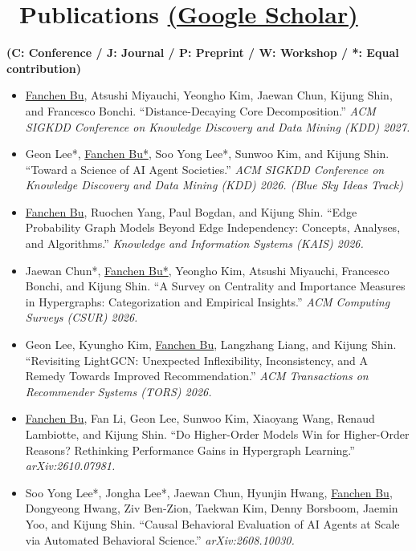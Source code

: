 \documentclass{resume}
\begin{document}
\section{\faBook\ Publications {\large\normalfont\bfseries\href{https://scholar.google.com/citations?user=XjNu7-AAAAAJ}{(Google Scholar)}}}
\textbf{(C: Conference / J: Journal / P: Preprint / W: Workshop / *: Equal contribution)}
\begin{itemize}[parsep=0.5ex]
  \item [{[C22]}]
  \underline{Fanchen Bu}, Atsushi Miyauchi, Yeongho Kim, Jaewan Chun, Kijung Shin, and Francesco Bonchi.
  ``Distance-Decaying Core Decomposition.''
  \textit{ACM SIGKDD Conference on Knowledge Discovery and Data Mining (KDD) 2027.}

  \item [{[C21]}]
  Geon Lee*, \underline{Fanchen Bu*}, Soo Yong Lee*, Sunwoo Kim, and Kijung Shin.
  ``Toward a Science of AI Agent Societies.''
  \textit{ACM SIGKDD Conference on Knowledge Discovery and Data Mining (KDD) 2026. (Blue Sky Ideas Track)}

  \item [{[J7]}]
  \underline{Fanchen Bu}, Ruochen Yang, Paul Bogdan, and Kijung Shin.
  ``Edge Probability Graph Models Beyond Edge Independency: Concepts, Analyses, and Algorithms.''
  \textit{Knowledge and Information Systems (KAIS) 2026.}

  \item [{[J6]}]
  Jaewan Chun*, \underline{Fanchen Bu*}, Yeongho Kim, Atsushi Miyauchi, Francesco Bonchi, and Kijung Shin.
  ``A Survey on Centrality and Importance Measures in Hypergraphs: Categorization and Empirical Insights.''
  \textit{ACM Computing Surveys (CSUR) 2026.}

  \item [{[J5]}]
  Geon Lee, Kyungho Kim, \underline{Fanchen Bu}, Langzhang Liang, and Kijung Shin.
  ``Revisiting LightGCN: Unexpected Inflexibility, Inconsistency, and A Remedy Towards Improved Recommendation.''
  \textit{ACM Transactions on Recommender Systems (TORS) 2026.}

  \item [{[P2]}]
  \underline{Fanchen Bu}, Fan Li, Geon Lee, Sunwoo Kim, Xiaoyang Wang, Renaud Lambiotte, and Kijung Shin.
  ``Do Higher-Order Models Win for Higher-Order Reasons? Rethinking Performance Gains in Hypergraph Learning.''
  \textit{arXiv:2610.07981.}

  \item [{[P1]}]
  Soo Yong Lee*, Jongha Lee*, Jaewan Chun, Hyunjin Hwang, \underline{Fanchen Bu}, Dongyeong Hwang, Ziv Ben-Zion, Taekwan Kim, Denny Borsboom, Jaemin Yoo, and Kijung Shin.
  ``Causal Behavioral Evaluation of AI Agents at Scale via Automated Behavioral Science.''
  \textit{arXiv:2608.10030.}


\end{itemize}
\end{document}
